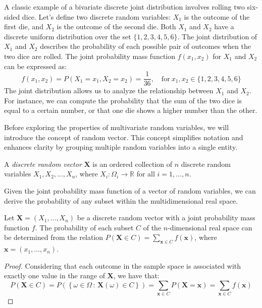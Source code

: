 \begin{example}
A classic example of a bivariate discrete joint distribution involves rolling two six-sided dice. Let's define two discrete random variables: $X_1$ is the outcome of the first die, and $X_2$ is the outcome of the second die. Both $X_1$ and $X_2$ have a discrete uniform distribution over the set $\{1, 2, 3, 4, 5, 6\}$. The joint distribution of $X_1$ and $X_2$ describes the probability of each possible pair of outcomes when the two dice are rolled. The joint probability mass function $f(x_1, x_2)$ for $X_1$ and $X_2$ can be expressed as:
\[
f(x_1, x_2) = P(X_1 = x_1, X_2 = x_2) = \frac{1}{36}, \quad \text{for} \ x_1, x_2 \in \{1, 2, 3, 4, 5, 6\}
\]
The joint distribution allows us to analyze the relationship between $X_1$ and $X_2$. For instance, we can compute the probability that the sum of the two dice is equal to a certain number, or that one die shows a higher number than the other.
\end{example}

Before exploring the properties of multivariate random variables, we will introduce the concept of random vector. This concept simplifies notation and enhances clarity by grouping multiple random variables into a single entity.

\begin{definition}
A \emph{discrete random vector} $\mathbf{X}$ is an ordered collection of $n$ discrete random variables $X_1, X_2, \ldots, X_n$, where $X_i : \Omega_i \rightarrow \mathbb{R}$ for all $i=1, \ldots, n$.
\end{definition}

Given the joint probability mass function of a vector of random variables, we can derive the probability of any subset within the multidimensional real space.

\begin{proposition}
Let $\mathbf{X}=\left(X_{1}, \ldots, X_{n}\right)$ be a discrete random vector with a joint probability mass function $f$. The probability of each subset $C$ of the $n$-dimensional real space can be determined from the relation $P\left(\mathbf{X} \in C\right)=\sum_{\mathbf{x} \in C}f\left(\mathbf{x}\right)$, where $\mathbf{x} = (x_{1}, \ldots, x_{n})$.
\end{proposition}
\begin{proof}
Considering that each outcome in the sample space is associated with exactly one value in the range of $\mathbf{X}$, we have that:
\[
P\left(\mathbf{X} \in C\right) = P \left( \left\{ \omega \in \Omega \,:\, \mathbf{X}(\omega) \in C\right\} \right) = \sum_{\mathbf{x}\in C} P\left( \mathbf{X} = \mathbf{x} \right) = \sum_{\mathbf{x}\in C}f\left(\mathbf{x}\right)
\]
\end{proof}

